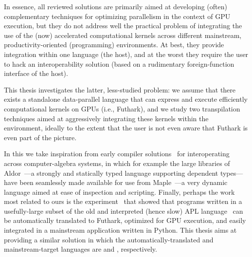 %

In essence, all reviewed solutions are primarily aimed at developing (often) 
complementary techniques for optimizing parallelism in the context of GPU 
execution, but they do not address well the practical problem of integrating 
the use of the (now) accelerated computational kernels across different 
mainstream, productivity-oriented (programming) environments.
At best, they provide integration within one language (the host), 
and at the worst they require the user to hack an interoperability 
solution (based on a rudimentary foreign-function interface of the host). 


This thesis investigates the latter, less-studied problem: we assume that
there exists a standalone data-parallel language that can express and 
execute efficiently computational kernels on GPUs (i.e., Futhark), and 
we study two transpilation techniques aimed at aggressively integrating
these kernels within the \fsharp{} environment, ideally to the extent that
the user is not even aware that Futhark is even part of the picture.

In this we take inspiration from early compiler 
solutions~\cite{alma:ISSAC,mapal_synasc} for interoperating
across computer-algebra systems, in which for example
the large libraries of Aldor~\cite{aldor}---a strongly and statically typed 
language supporting dependent types---have been seamlessly made available 
for use from Maple~\cite{maple_guide}---a very dynamic language aimed at 
ease of inspection and scripting.
%
Finally, perhaps the work most related to ours
is the experiment~\cite{apltail} that showed that programs 
written in a usefully-large subset of the old and interpreted (hence slow) APL 
language~\cite{dyalogbook} can be automatically translated to Futhark, 
optimized for GPU execution, and easily integrated in a mainstream application
written in Python. This thesis aims at providing a similar solution in which
the automatically-translated and mainstream-target languages are \fsharp{}
and \csharp{}, respectively.

